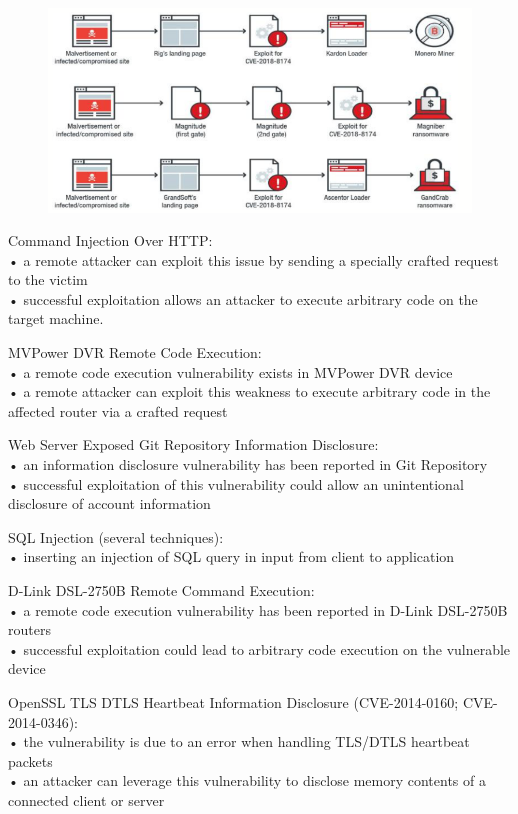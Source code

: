 \documentclass[]{project_plan}
\begin{document}
\begin{figure}[H]
  \centering
  \includegraphics[width=\linewidth]{exploit kit.png}
\end{figure}

Command Injection Over HTTP:\\
• a remote attacker can exploit this issue by sending a specially crafted request to the victim\\
• successful exploitation allows an attacker to execute arbitrary code on the target machine.

MVPower DVR Remote Code Execution:\\
• a remote code execution vulnerability exists in MVPower DVR device\\
• a remote attacker can exploit this weakness to execute arbitrary code in the affected router via a crafted request

Web Server Exposed Git Repository Information Disclosure:\\
• an information disclosure vulnerability has been reported in Git Repository\\
• successful exploitation of this vulnerability could allow an unintentional disclosure of account information

SQL Injection (several techniques):\\
• inserting an injection of SQL query in input from client to application

D-Link DSL-2750B Remote Command Execution:\\
• a remote code execution vulnerability has been reported in D-Link DSL-2750B routers\\
• successful exploitation could lead to arbitrary code execution on the vulnerable device

OpenSSL TLS DTLS Heartbeat Information Disclosure (CVE-2014-0160; CVE-2014-0346):\\
• the vulnerability is due to an error when handling TLS/DTLS heartbeat packets\\
• an attacker can leverage this vulnerability to disclose memory contents of a connected client or server
\end{document}
